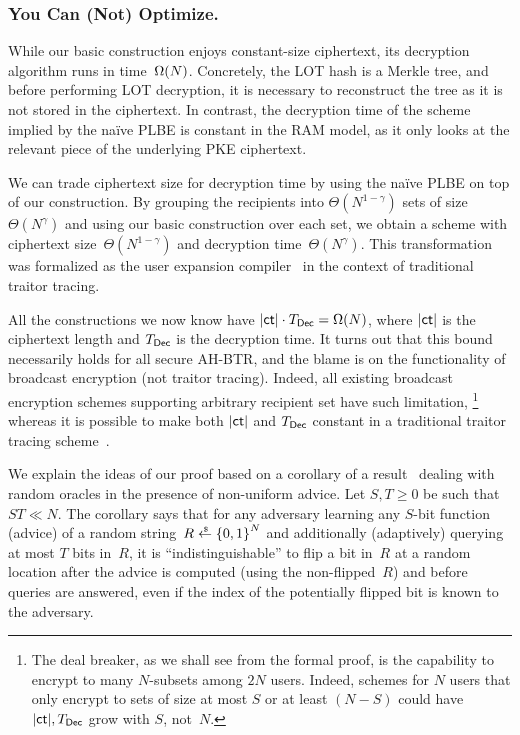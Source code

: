 \subsubsection{You Can (Not) Optimize.}
While our basic construction enjoys constant-size ciphertext,
its decryption algorithm runs in time~$\operatorname{\Omega}(N)$.
Concretely, the LOT hash is a Merkle tree, and before performing LOT decryption, it is necessary to reconstruct the tree as it is not stored in the ciphertext.
In contrast, the decryption time of the scheme implied by the na{\"i}ve PLBE is constant in the RAM model, as it only looks at the relevant piece of the underlying PKE ciphertext.

We can trade ciphertext size for decryption time by using the na{\"i}ve PLBE on top of our construction.
By grouping the recipients into $\Theta(N^{1-\gamma})$ sets of size~$\Theta(N^\gamma)$ and using our basic construction over each set, we obtain a scheme with ciphertext size~$\Theta(N^{1-\gamma})$ and decryption time~$\Theta(N^\gamma)$.
This transformation was formalized as the user expansion compiler~\cite{C:Zhandry20} in the context of traditional traitor tracing.

All the constructions we now know have ${|\ct|\cdot\TDec=\bigOmega(N)}$,
where $|\ct|$ is the ciphertext length and $\TDec$ is the decryption time.
It turns out that this bound necessarily holds for all secure AH-BTR, and
the blame is on the functionality of broadcast encryption (not traitor tracing).
Indeed, all existing broadcast encryption schemes supporting arbitrary recipient set have such limitation,%
\footnote{The deal breaker, as we shall see from the formal proof, is the capability to encrypt to many $N$-subsets among $2N$ users.
Indeed, schemes for $N$ users that only encrypt to sets of size at most $S$ or at least $({N-S})$ could have $|\ct|,\TDec$ grow with $S$, not~$N$.}
whereas
it is possible to make both $|\ct|$ and $\TDec$ constant in a traditional traitor tracing scheme~\cite{C:BonZha14}.

We explain the ideas of our proof based on a corollary of a result~\cite{C:Unruh07} dealing with random oracles in the presence of non-uniform advice.
Let ${S,T\geq 0}$ be such that ${ST\ll N}$.
The corollary says that
for any adversary learning any $S$-bit function (advice) of a random string~${R\draws\bit^N}$ and additionally (adaptively) querying at most $T$ bits in~$R$,
it is ``indistinguishable'' to flip a bit in~$R$ at a random location
after the advice is computed (using the non-flipped~$R$) and
before queries are answered,
even if the index of the potentially flipped bit is known to the adversary.

